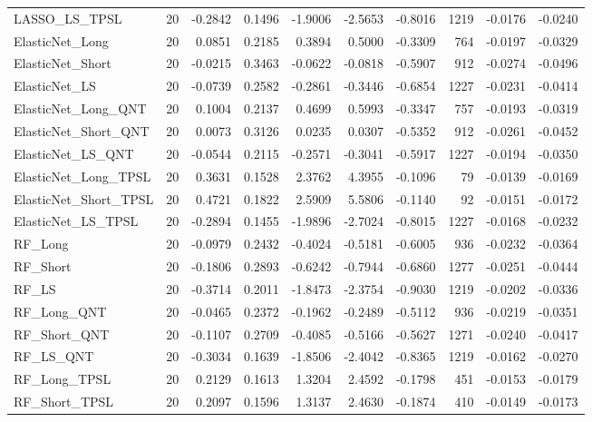 \begin{tabular}{llrrrrrrrr}
\cline{1-10}
LASSO\_LS\_TPSL & 20 & -0.2842 & 0.1496 & -1.9006 & -2.5653 & -0.8016 & 1219 & -0.0176 & -0.0240 \\
\cline{1-10}
ElasticNet\_Long & 20 & 0.0851 & 0.2185 & 0.3894 & 0.5000 & -0.3309 & 764 & -0.0197 & -0.0329 \\
\cline{1-10}
ElasticNet\_Short & 20 & -0.0215 & 0.3463 & -0.0622 & -0.0818 & -0.5907 & 912 & -0.0274 & -0.0496 \\
\cline{1-10}
ElasticNet\_LS & 20 & -0.0739 & 0.2582 & -0.2861 & -0.3446 & -0.6854 & 1227 & -0.0231 & -0.0414 \\
\cline{1-10}
ElasticNet\_Long\_QNT & 20 & 0.1004 & 0.2137 & 0.4699 & 0.5993 & -0.3347 & 757 & -0.0193 & -0.0319 \\
\cline{1-10}
ElasticNet\_Short\_QNT & 20 & 0.0073 & 0.3126 & 0.0235 & 0.0307 & -0.5352 & 912 & -0.0261 & -0.0452 \\
\cline{1-10}
ElasticNet\_LS\_QNT & 20 & -0.0544 & 0.2115 & -0.2571 & -0.3041 & -0.5917 & 1227 & -0.0194 & -0.0350 \\
\cline{1-10}
ElasticNet\_Long\_TPSL & 20 & 0.3631 & 0.1528 & 2.3762 & 4.3955 & -0.1096 & 79 & -0.0139 & -0.0169 \\
\cline{1-10}
ElasticNet\_Short\_TPSL & 20 & 0.4721 & 0.1822 & 2.5909 & 5.5806 & -0.1140 & 92 & -0.0151 & -0.0172 \\
\cline{1-10}
ElasticNet\_LS\_TPSL & 20 & -0.2894 & 0.1455 & -1.9896 & -2.7024 & -0.8015 & 1227 & -0.0168 & -0.0232 \\
\cline{1-10}
RF\_Long & 20 & -0.0979 & 0.2432 & -0.4024 & -0.5181 & -0.6005 & 936 & -0.0232 & -0.0364 \\
\cline{1-10}
RF\_Short & 20 & -0.1806 & 0.2893 & -0.6242 & -0.7944 & -0.6860 & 1277 & -0.0251 & -0.0444 \\
\cline{1-10}
RF\_LS & 20 & -0.3714 & 0.2011 & -1.8473 & -2.3754 & -0.9030 & 1219 & -0.0202 & -0.0336 \\
\cline{1-10}
RF\_Long\_QNT & 20 & -0.0465 & 0.2372 & -0.1962 & -0.2489 & -0.5112 & 936 & -0.0219 & -0.0351 \\
\cline{1-10}
RF\_Short\_QNT & 20 & -0.1107 & 0.2709 & -0.4085 & -0.5166 & -0.5627 & 1271 & -0.0240 & -0.0417 \\
\cline{1-10}
RF\_LS\_QNT & 20 & -0.3034 & 0.1639 & -1.8506 & -2.4042 & -0.8365 & 1219 & -0.0162 & -0.0270 \\
\cline{1-10}
RF\_Long\_TPSL & 20 & 0.2129 & 0.1613 & 1.3204 & 2.4592 & -0.1798 & 451 & -0.0153 & -0.0179 \\
\cline{1-10}
RF\_Short\_TPSL & 20 & 0.2097 & 0.1596 & 1.3137 & 2.4630 & -0.1874 & 410 & -0.0149 & -0.0173 \\

\end{tabular}
